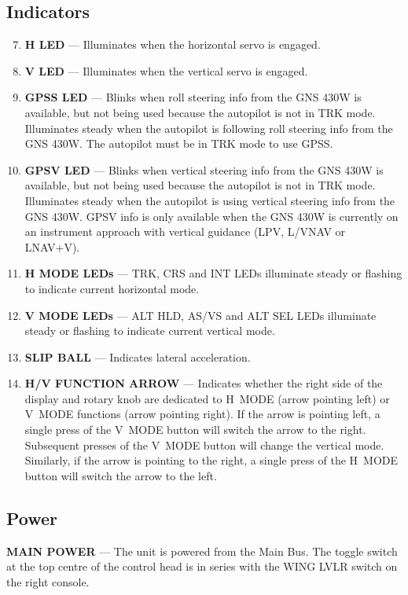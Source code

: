 \subsection*{Indicators} 
\begin{enumerate}
\setcounter{enumi}{6} 
\item \textbf{H LED} --- Illuminates when the horizontal servo is engaged. 
\item \textbf{V LED} --- Illuminates when the vertical servo is engaged. 
\item \textbf{GPSS LED} --- Blinks when roll steering info from the GNS 430W is available, but not being used because the autopilot is not in TRK mode. Illuminates steady when the autopilot is following roll steering info from the GNS 430W. The autopilot must be in TRK mode to use GPSS.
\item\textbf{GPSV LED} --- Blinks when vertical steering info from the GNS 430W is available, but not being used because the autopilot is not in TRK mode. Illuminates steady when the autopilot is using vertical steering info from the GNS 430W. GPSV info is only available when the GNS 430W is currently on an instrument approach with vertical guidance (LPV, L/VNAV or LNAV+V).
\item \textbf{H MODE LEDs} --- TRK, CRS and INT LEDs illuminate steady or flashing to indicate current horizontal mode.
\item \textbf{V MODE LEDs} --- ALT HLD, AS/VS and ALT SEL LEDs illuminate steady or flashing to indicate current vertical mode.
\item \textbf{SLIP BALL} --- Indicates lateral acceleration. 
\item \textbf{H/V FUNCTION ARROW} --- Indicates whether the right side of the display and rotary knob are dedicated to H~MODE (arrow pointing left) or V~MODE functions (arrow pointing right). If the arrow is pointing left, a single press of the V~MODE button will switch the arrow to the right. Subsequent presses of the V~MODE button will change the vertical mode. Similarly, if the arrow is pointing to the right, a single press of the H~MODE button will switch the arrow to the left.
\end{enumerate}

\subsection*{Power}

\textbf{MAIN POWER} --- The unit is powered from the Main Bus. The toggle switch at the top centre of the control head is in series with the WING LVLR switch on the right console.

